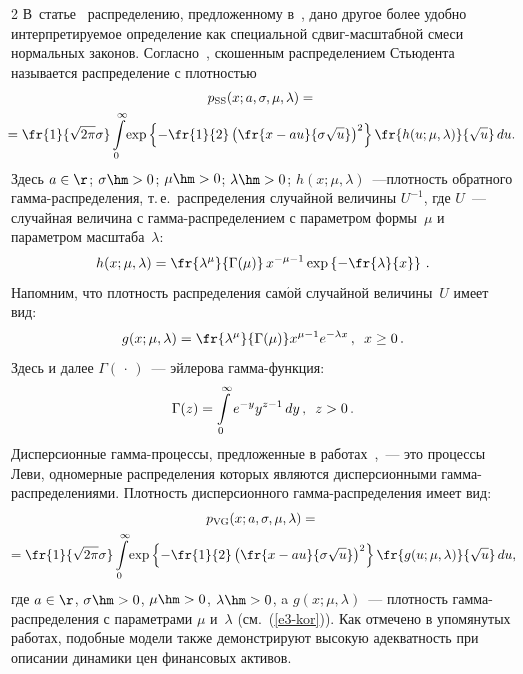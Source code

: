 \begin{multicols}{2}
В~статье~\cite{KimMcCulloch2007} 
распределению, предложенному в~\cite{AasHaff2006}, дано другое более удобно ин\-тер\-пре\-ти\-ру\-емое
определение как специальной сдвиг-мас\-штаб\-ной смеси нормальных
законов. Согласно~\cite{KimMcCulloch2007}, скошенным
распределением Стьюдента называется распределение с плот\-ностью
\begin{multline}
p_{\mathrm{SS}}(x;a,\sigma,\mu,\lambda)={}\\
\hspace*{-2mm}{}=\fr{1}{\sqrt{2\pi}\sigma}\int\limits_{0}^{\infty}\!
\exp\left\{-\fr{1}{2}\left(\fr{x-a u}{\sigma\sqrt{u}}\right)^2\right\}
\fr{h(u;\mu,\lambda)}{\sqrt{u}}\,du.\!\label{e1-kor}
\end{multline}
Здесь $a\in\r$; $\sigma\hm>0$; $\mu\hm>0$; $\lambda\hm>0$;
$h(x;\mu,\lambda)$~---плотность обратного гам\-ма-рас\-пре\-де\-ле\-ния, т.\,е.\ распределения
случайной величины $U^{-1}$, где $U$~--- случайная величина с
гам\-ма-рас\-пре\-де\-ле\-ни\-ем с параметром формы~$\mu$ и параметром
масштаба~$\lambda$:
\begin{equation}
h(x;\mu,\lambda)= \fr{\lambda^\mu}{\Gamma(\mu)}\,x^{-\mu-1}\exp
\left\{-\fr{\lambda}{x}\right\}\,.\label{e2-kor}
\end{equation}
 Напомним, что плот\-ность распределения
сам$\acute{\mbox{о}}$й случайной величины~$U$ имеет вид:
\begin{equation}
g(x;\mu,\lambda)=\fr{\lambda^{\mu}}{\Gamma(\mu)}x^{\mu-1}e^{-\lambda
x}\,,\enskip x\ge0\,.\label{e3-kor}
\end{equation}
Здесь и далее $\Gamma(\,\cdot\,)$~--- эйлерова гам\-ма-функ\-ция:
$$
\Gamma(z) = \int\limits_{0}^{\infty}e^{-y}y^{z-1}\,dy\,,\enskip z>0\,.
$$
Дисперсионные гамма-про\-цес\-сы, предложенные в 
работах~\cite{MadanSeneta1990, CarrMadanChang1998},~--- это процессы Леви,
одномерные распределения которых являются дисперсионными
гам\-ма-рас\-пре\-де\-ле\-ни\-ями. Плотность дисперсионного
гам\-ма-рас\-пре\-де\-ле\-ния имеет вид:
\begin{multline}
p_{\mathrm{VG}}(x;a,\sigma,\mu,\lambda)={}\\
\!\!{}=\fr{1}{\sqrt{2\pi}\sigma}
\int\limits_{0}^{\infty}\!\exp\left\{-\fr{1}{2}\left(\fr{x-au}{\sigma\sqrt{u}}\right)^2\right\}
\fr{g(u;\mu,\lambda)}{\sqrt{u}}\,du,\!\label{e4-kor}
\end{multline}
где $a\in\r$, $\sigma\hm>0$, $\mu\hm>0$, $\lambda\hm>0$, a
$g(x;\mu,\lambda)$~--- плот\-ность гам\-ма-рас\-пре\-де\-ле\-ния с параметрами
$\mu$ и~$\lambda$ (см.~(\ref{e3-kor})). Как отмечено в упомянутых работах,
подобные модели также демонстрируют высокую адекватность при
описании динамики цен финансовых активов.


\end{multicols}

